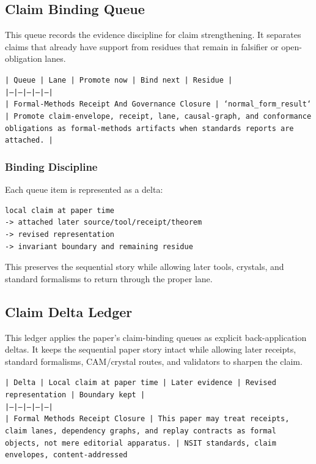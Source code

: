 \documentclass[11pt]{article}
\begin{document}
\subsection*{Claim Binding Queue}

This queue records the evidence discipline for claim strengthening. It separates claims that already have support from residues that remain in falsifier or open-obligation lanes.

\noindent\texttt{| Queue | Lane | Promote now | Bind next | Residue |}\\
\noindent\texttt{|---|---|---|---|---|}\\
\noindent\texttt{| Formal-Methods Receipt And Governance Closure | `normal\_form\_result` | Promote claim-envelope, receipt, lane, causal-graph, and conformance obligations as formal-methods artifacts when standards reports are attached. |}\\

\subsubsection*{Binding Discipline}

Each queue item is represented as a delta:

\begin{verbatim}
local claim at paper time
-> attached later source/tool/receipt/theorem
-> revised representation
-> invariant boundary and remaining residue
\end{verbatim}

This preserves the sequential story while allowing later tools, crystals, and
standard formalisms to return through the proper lane.

\subsection*{Claim Delta Ledger}

This ledger applies the paper's claim-binding queues as explicit back-application
deltas. It keeps the sequential paper story intact while allowing later
receipts, standard formalisms, CAM/crystal routes, and validators to sharpen the
claim.

\noindent\texttt{| Delta | Local claim at paper time | Later evidence | Revised representation | Boundary kept |}\\
\noindent\texttt{|---|---|---|---|---|}\\
\noindent\texttt{| Formal Methods Receipt Closure | This paper may treat receipts, claim lanes, dependency graphs, and replay contracts as formal objects, not mere editorial apparatus. | NSIT standards, claim envelopes, content-addressed}\\
\end{document}
